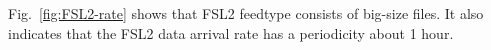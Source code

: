 Fig.~\ref{fig:FSL2-rate} shows that FSL2 feedtype consists of big-size files. It also indicates that the FSL2 data arrival rate has a periodicity about 1 hour.







